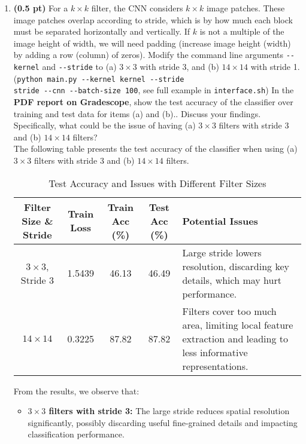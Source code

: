 \begin{enumerate}
\item {\bf (0.5 pt)} For a  $k \times k$  filter, the CNN considers $k \times k$
image patches.  These image patches overlap according to stride, which is by how
much each block must be separated horizontally and vertically.  If $k$ is not a
multiple of the image height of width, we will need padding (increase image
height (width) by adding a row (column) of zeros).
Modify the command line arguments \verb|--kernel| and \verb|--stride| to (a) $3
\times 3$ with stride 3, and (b) $14 \times 14$ with stride 1.  
(\verb|python main.py --kernel kernel --stride|\\ \verb|stride --cnn --batch-size 100|, 
see full example in \texttt{interface.sh}) In the {\bf PDF report on Gradescope},
show the test accuracy of the classifier over training and test data for items
(a) and (b)..  Discuss your findings. Specifically, what could be the issue of
having (a) $3\times 3$ filters with stride 3 and (b) $14 \times 14$ filters? \\

The following table presents the test accuracy of the classifier when using 
(a) $3\times 3$ filters with stride 3 and (b) $14 \times 14$ filters.

\begin{table}[h]
    \centering
    \renewcommand{\arraystretch}{1.2}
    \setlength{\tabcolsep}{4pt}
    \begin{tabular}{|c|c|c|c|p{4.5cm}|}
        \hline
        \textbf{Filter Size \& Stride} & \textbf{Train Loss} & \textbf{Train Acc (\%)} & \textbf{Test Acc (\%)} & \textbf{Potential Issues} \\
        \hline
        $3\times 3$, Stride 3 & 1.5439 & 46.13 & 46.49 & Large stride lowers resolution, discarding key details, which may hurt performance. \\
        \hline
        $14\times 14$ & 0.3225 & 87.82 & 87.82 & Filters cover too much area, limiting local feature extraction and leading to less informative representations. \\
        \hline
    \end{tabular}
    \caption{Test Accuracy and Issues with Different Filter Sizes}
    \label{tab:filter_analysis}
\end{table}

From the results, we observe that:
\begin{itemize}
    \item \textbf{$3\times 3$ filters with stride 3:} The large stride 
    reduces spatial resolution significantly, possibly discarding 
    useful fine-grained details and impacting classification performance.
    

\end{itemize}
\end{enumerate}
